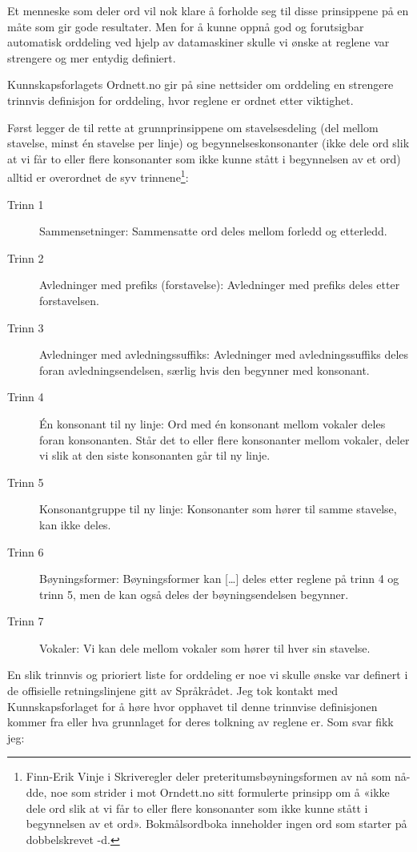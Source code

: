 Et menneske som deler ord vil nok klare å forholde seg til disse prinsippene på en måte som gir gode resultater. Men for å kunne oppnå god og forutsigbar automatisk orddeling ved hjelp av datamaskiner skulle vi ønske at reglene var strengere og mer entydig definiert.

Kunnskapsforlagets Ordnett.no gir på sine nettsider om orddeling en strengere trinnvis definisjon for orddeling\cite{ordnett-orddeling}, hvor reglene er ordnet etter viktighet.

Først legger de til rette at grunnprinsippene om stavelsesdeling (del mellom stavelse, minst én stavelse per linje) og begynnelseskonsonanter (ikke dele ord slik at vi får to eller flere konsonanter som ikke kunne stått i begynnelsen av et ord) alltid er overordnet de syv trinnene\footnote{Finn-Erik Vinje i Skriveregler\cite{vinje} deler preteritumsbøyningsformen av nå som nå-dde, noe som strider i mot Orndett.no sitt formulerte prinsipp om å «ikke dele ord slik at vi får to eller flere konsonanter som ikke kunne stått i begynnelsen av et ord»\cite{ordnett-orddeling}. Bokmålsordboka inneholder ingen ord som starter på dobbelskrevet -d.}: 

\begin{description}
	\item[Trinn 1] Sammensetninger: Sammensatte ord deles mellom forledd og etterledd.
	\item[Trinn 2] Avledninger med prefiks (forstavelse): Avledninger med prefiks deles etter forstavelsen.
	\item[Trinn 3] Avledninger med avledningssuffiks: Avledninger med avledningssuffiks deles foran avledningsendelsen, særlig hvis den begynner med konsonant.
	\item[ Trinn 4] Én konsonant til ny linje: Ord med én konsonant mellom vokaler deles foran konsonanten. Står det to eller flere konsonanter mellom vokaler, deler vi slik at den siste konsonanten går til ny linje. 
	\item[Trinn 5] Konsonantgruppe til ny linje: Konsonanter som hører til samme stavelse, kan ikke deles.
	\item[Trinn 6] Bøyningsformer: Bøyningsformer kan […] deles etter reglene på trinn 4 og trinn 5, men de kan også deles der bøyningsendelsen begynner.
	\item[Trinn 7] Vokaler: Vi kan dele mellom vokaler som hører til hver sin stavelse.
\end{description}

En slik trinnvis og prioriert liste for orddeling er noe vi skulle ønske var definert i de offisielle retningslinjene gitt av Språkrådet. Jeg tok kontakt med Kunnskapsforlaget for å høre hvor opphavet til denne trinnvise definisjonen kommer fra eller hva grunnlaget for deres tolkning av reglene er. Som svar fikk jeg\cite{epost-orddeling}:

